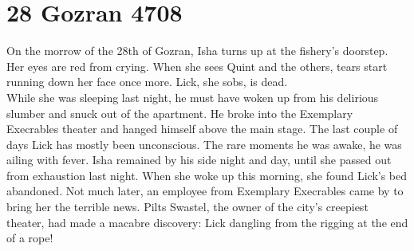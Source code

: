 \section{28 Gozran 4708}

On the morrow of the 28th of Gozran, Isha turns up at the fishery's doorstep. Her eyes are red from crying. When she sees Quint and the others, tears start running down her face once more. Lick, she sobs, is dead.\\

While she was sleeping last night, he must have woken up from his delirious slumber and snuck out of the apartment. He broke into the Exemplary Execrables theater and hanged himself above the main stage. The last couple of days Lick has mostly been unconscious. The rare moments he was awake, he was ailing with fever. Isha remained by his side night and day, until she passed out from exhaustion last night. When she woke up this morning, she found Lick's bed abandoned. Not much later, an employee from Exemplary Execrables came by to bring her the terrible news. Pilts Swastel, the owner of the city's creepiest theater, had made a macabre discovery: Lick dangling from the rigging at the end of a rope!\\

